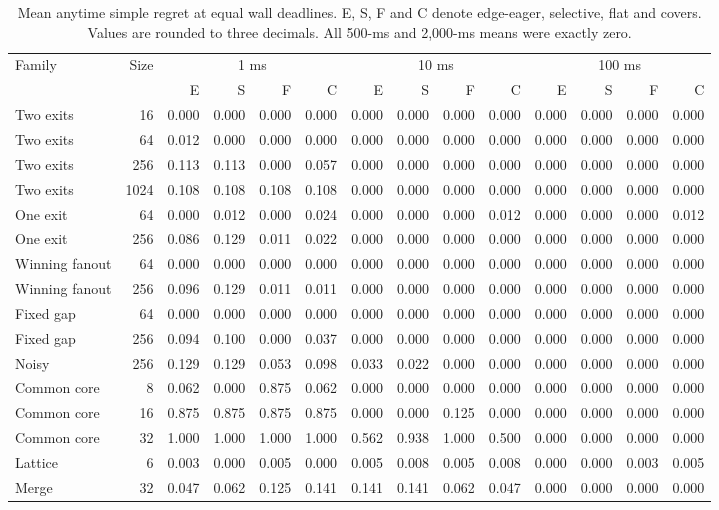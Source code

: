 \begin{table}[t]
\centering\small
\setlength{\tabcolsep}{3pt}
\caption{Mean anytime simple regret at equal wall deadlines. E, S, F and C denote edge-eager, selective, flat and covers. Values are rounded to three decimals. All 500-ms and 2,000-ms means were exactly zero.}
\label{tab:ta-regret}
\begin{tabular}{lr rrrrrrrrrrrr}\toprule
Family & Size & \multicolumn{4}{c}{1 ms} & \multicolumn{4}{c}{10 ms} & \multicolumn{4}{c}{100 ms}\\ & & E & S & F & C & E & S & F & C & E & S & F & C\\\midrule
Two exits & 16 & 0.000 & 0.000 & 0.000 & 0.000 & 0.000 & 0.000 & 0.000 & 0.000 & 0.000 & 0.000 & 0.000 & 0.000\\
Two exits & 64 & 0.012 & 0.000 & 0.000 & 0.000 & 0.000 & 0.000 & 0.000 & 0.000 & 0.000 & 0.000 & 0.000 & 0.000\\
Two exits & 256 & 0.113 & 0.113 & 0.000 & 0.057 & 0.000 & 0.000 & 0.000 & 0.000 & 0.000 & 0.000 & 0.000 & 0.000\\
Two exits & 1024 & 0.108 & 0.108 & 0.108 & 0.108 & 0.000 & 0.000 & 0.000 & 0.000 & 0.000 & 0.000 & 0.000 & 0.000\\
One exit & 64 & 0.000 & 0.012 & 0.000 & 0.024 & 0.000 & 0.000 & 0.000 & 0.012 & 0.000 & 0.000 & 0.000 & 0.012\\
One exit & 256 & 0.086 & 0.129 & 0.011 & 0.022 & 0.000 & 0.000 & 0.000 & 0.000 & 0.000 & 0.000 & 0.000 & 0.000\\
Winning fanout & 64 & 0.000 & 0.000 & 0.000 & 0.000 & 0.000 & 0.000 & 0.000 & 0.000 & 0.000 & 0.000 & 0.000 & 0.000\\
Winning fanout & 256 & 0.096 & 0.129 & 0.011 & 0.011 & 0.000 & 0.000 & 0.000 & 0.000 & 0.000 & 0.000 & 0.000 & 0.000\\
Fixed gap & 64 & 0.000 & 0.000 & 0.000 & 0.000 & 0.000 & 0.000 & 0.000 & 0.000 & 0.000 & 0.000 & 0.000 & 0.000\\
Fixed gap & 256 & 0.094 & 0.100 & 0.000 & 0.037 & 0.000 & 0.000 & 0.000 & 0.000 & 0.000 & 0.000 & 0.000 & 0.000\\
Noisy & 256 & 0.129 & 0.129 & 0.053 & 0.098 & 0.033 & 0.022 & 0.000 & 0.000 & 0.000 & 0.000 & 0.000 & 0.000\\
Common core & 8 & 0.062 & 0.000 & 0.875 & 0.062 & 0.000 & 0.000 & 0.000 & 0.000 & 0.000 & 0.000 & 0.000 & 0.000\\
Common core & 16 & 0.875 & 0.875 & 0.875 & 0.875 & 0.000 & 0.000 & 0.125 & 0.000 & 0.000 & 0.000 & 0.000 & 0.000\\
Common core & 32 & 1.000 & 1.000 & 1.000 & 1.000 & 0.562 & 0.938 & 1.000 & 0.500 & 0.000 & 0.000 & 0.000 & 0.000\\
Lattice & 6 & 0.003 & 0.000 & 0.005 & 0.000 & 0.005 & 0.008 & 0.005 & 0.008 & 0.000 & 0.000 & 0.003 & 0.005\\
Merge & 32 & 0.047 & 0.062 & 0.125 & 0.141 & 0.141 & 0.141 & 0.062 & 0.047 & 0.000 & 0.000 & 0.000 & 0.000\\
\bottomrule\end{tabular}
\end{table}
